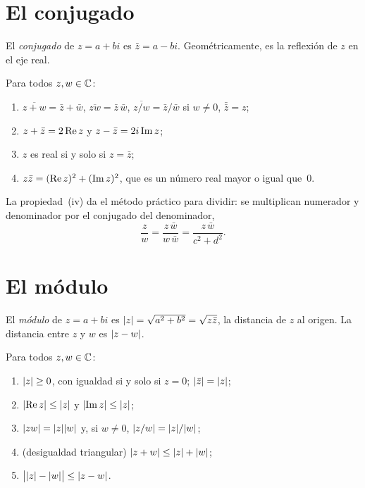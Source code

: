 \addtocounter{definicion}{1}%

\section{El conjugado}

\begin{definicion}[Conjugado]
El \emph{conjugado} de $z=a+bi$ es $\bar z=a-bi$. Geométricamente, es la reflexión de $z$ en el eje real.
\end{definicion}

\begin{proposicion}\label{prop:conjugado}
Para todos $z,w\in\mathbb{C}$:
\begin{enumerate}
  \item $\overline{z+w}=\bar z+\bar w$, \quad $\overline{zw}=\bar z\,\bar w$, \quad $\overline{z/w}=\bar z/\bar w$ si $w\ne0$, \quad $\bar{\bar z}=z$;
  \item $z+\bar z=2\operatorname{Re} z$ y $z-\bar z=2i\operatorname{Im} z$;
  \item $z$ es real si y solo si $z=\bar z$;
  \item $z\bar z=(\operatorname{Re} z)^{2}+(\operatorname{Im} z)^{2}$, que es un número real mayor o igual que~0.
\end{enumerate}
\end{proposicion}

La propiedad~(iv) da el método práctico para dividir: se multiplican numerador y denominador por el conjugado del denominador,
\[
\frac{z}{w}=\frac{z\,\bar w}{w\,\bar w}=\frac{z\,\bar w}{c^{2}+d^{2}} .
\]

\addtocounter{definicion}{1}%

\section{El módulo}

\begin{definicion}[Módulo]
El \emph{módulo} de $z=a+bi$ es $\lvert z\rvert=\sqrt{a^{2}+b^{2}}=\sqrt{z\bar z}$, la distancia de $z$ al origen. La distancia entre $z$ y $w$ es $\lvert z-w\rvert$.
\end{definicion}

\begin{proposicion}\label{prop:modulo}
Para todos $z,w\in\mathbb{C}$:
\begin{enumerate}
  \item $\lvert z\rvert\ge0$, con igualdad si y solo si $z=0$; \quad $\lvert\bar z\rvert=\lvert z\rvert$;
  \item $\lvert\operatorname{Re} z\rvert\le\lvert z\rvert$ y $\lvert\operatorname{Im} z\rvert\le\lvert z\rvert$;
  \item $\lvert zw\rvert=\lvert z\rvert\lvert w\rvert$ y, si $w\ne0$, $\lvert z/w\rvert=\lvert z\rvert/\lvert w\rvert$;
  \item (desigualdad triangular) $\lvert z+w\rvert\le\lvert z\rvert+\lvert w\rvert$;
  \item $\bigl|\lvert z\rvert-\lvert w\rvert\bigr|\le\lvert z-w\rvert$.
\end{enumerate}
\end{proposicion}

